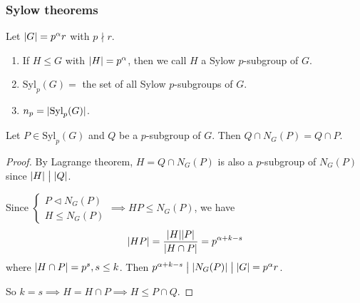 \subsubsection{Sylow theorems}

\begin{definition}
  Let $\abs{G} = p^\alpha r$ with $p \nmid r$.
  \begin{enumerate}
    \item If $H \le G$ with $\abs{H} = p^\alpha$, then we call $H$ a Sylow
      $p$-subgroup of $G$.
    \item $\text{Syl}_p(G) =$ the set of all Sylow $p$-subgroups of $G$.
    \item $n_p = \abs{\text{Syl}_p(G)}$.
  \end{enumerate}
\end{definition}

\begin{lemma}
  Let $P \in \text{Syl}_p(G)$ and $Q$ be a $p$-subgroup of $G$. Then
  $Q \cap N_G(P) = Q \cap P$.

  \begin{proof}
    By Lagrange theorem, $H = Q \cap N_G(P)$ is also a $p$-subgroup of
    $N_G(P)$ since $\abs{H} \Div \abs{Q}$.

    Since $\begin{cases}
      P \lhd N_G(P) \\
      H \le N_G(P)
    \end{cases} \implies HP \le N_G(P)$, we have
    \[
      \abs{HP} = \frac{\abs{H}\abs{P}}{\abs{H\cap P}} = p^{\alpha+k-s}
    \]
    where $\abs{H\cap P} = p^s, s \le k$. Then
    $p^{\alpha+k-s} \Div \abs*{N_G(P)} \Div \abs{G} = p^\alpha r$.

    So $k = s \implies H = H \cap P \implies H \le P \cap Q$.
  \end{proof}
\end{lemma}

